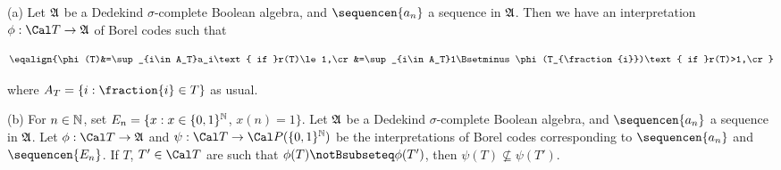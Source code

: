  (a) Let $\frak A$ be a Dedekind $\sigma$-complete
Boolean algebra, and $\sequencen{a_n}$ a sequence in $\frak A$.   Then we
have an interpretation $\phi:\Cal T\to\frak A$ of Borel codes such that

$$\eqalign{\phi(T)&=\sup_{i\in A_T}a_i\text{ if }r(T)\le 1,\cr
&=\sup_{i\in A_T}1\Bsetminus\phi(T_{\fraction{i}})\text{ if }r(T)>1,\cr}$$

\noindent where $A_T=\{i:\fraction{i}\in T\}$ as usual.

(b) For $n\in\Bbb N$, set $E_n=\{x:x\in\{0,1\}^{\Bbb N}$, $x(n)=1\}$.
Let $\frak A$ be a Dedekind $\sigma$-complete Boolean
algebra, and $\sequencen{a_n}$ a sequence in $\frak A$.   Let
$\phi:\Cal T\to\frak A$ and $\psi:\Cal T\to\Cal P(\{0,1\}^{\Bbb N})$
be the interpretations of Borel codes
corresponding to $\sequencen{a_n}$ and $\sequencen{E_n}$.
If $T$, $T'\in\Cal T$ are such that $\phi(T)\notBsubseteq\phi(T')$, then
$\psi(T)\not\subseteq\psi(T')$.


